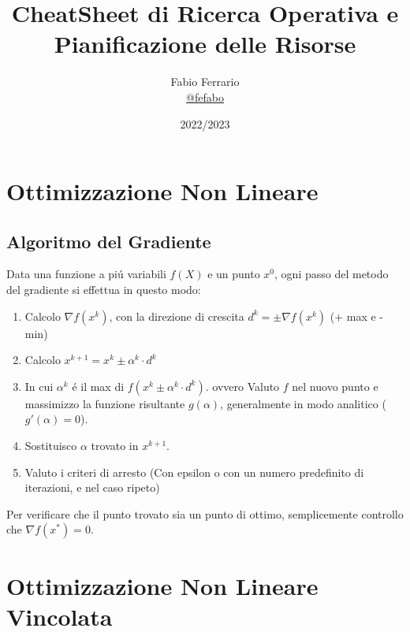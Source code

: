 \documentclass[12pt, a4paper, openany]{book}
\begin{document}
\title{CheatSheet di Ricerca Operativa e Pianificazione delle Risorse}

\author{
	Fabio Ferrario\\
	\small{\href{https://t.me/fefabo}{@fefabo}}
}
\date{2022/2023}

\maketitle

\tableofcontents

\chapter{Ottimizzazione Non Lineare}
\section{Algoritmo del Gradiente}
Data una funzione a piú variabili $f(X)$ e un punto $x^0$, ogni passo del metodo del gradiente si effettua in questo modo:
\begin{enumerate}
    \item Calcolo $\nabla f(x^k)$, con la direzione di crescita $d^k=\pm \nabla f(x^k)$ ($+$ max e - min)
    \item Calcolo $x^{k+1} = x^k \pm \alpha^k \cdot d^k$
    \item In cui $\alpha^k$ é il max di $f(x^k \pm \alpha^k \cdot d^k)$. ovvero
    Valuto $f$ nel nuovo punto e massimizzo la funzione risultante $g(\alpha)$, generalmente in modo analitico ($g'(\alpha)=0$).
    \item Sostituisco $\alpha$ trovato in $x^{k+1}$.
    \item Valuto i criteri di arresto (Con epsilon o con un numero predefinito di iterazioni, e nel caso ripeto)
\end{enumerate}
Per verificare che il punto trovato sia un punto di ottimo, semplicemente controllo che $\nabla f(x^*) = 0$.

\chapter{Ottimizzazione Non Lineare Vincolata}
\end{document}
